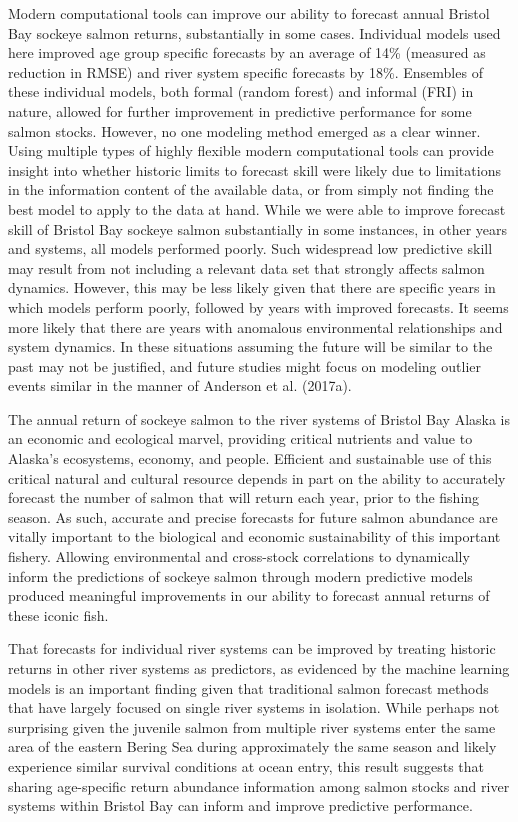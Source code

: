 \documentclass[
]{article}
\begin{document}
Modern computational tools can improve our ability to forecast annual Bristol Bay sockeye salmon returns, substantially in some cases. Individual models used here improved age group specific forecasts by an average of 14\% (measured as reduction in RMSE) and river system specific forecasts by 18\%. Ensembles of these individual models, both formal (random forest) and informal (FRI) in nature, allowed for further improvement in predictive performance for some salmon stocks. However, no one modeling method emerged as a clear winner. Using multiple types of highly flexible modern computational tools can provide insight into whether historic limits to forecast skill were likely due to limitations in the information content of the available data, or from simply not finding the best model to apply to the data at hand. While we were able to improve forecast skill of Bristol Bay sockeye salmon substantially in some instances, in other years and systems, all models performed poorly. Such widespread low predictive skill may result from not including a relevant data set that strongly affects salmon dynamics. However, this may be less likely given that there are specific years in which models perform poorly, followed by years with improved forecasts. It seems more likely that there are years with anomalous environmental relationships and system dynamics. In these situations assuming the future will be similar to the past may not be justified, and future studies might focus on modeling outlier events similar in the manner of Anderson et al. (2017a).

The annual return of sockeye salmon to the river systems of Bristol Bay Alaska is an economic and ecological marvel, providing critical nutrients and value to Alaska's ecosystems, economy, and people. Efficient and sustainable use of this critical natural and cultural resource depends in part on the ability to accurately forecast the number of salmon that will return each year, prior to the fishing season. As such, accurate and precise forecasts for future salmon abundance are vitally important to the biological and economic sustainability of this important fishery. Allowing environmental and cross-stock correlations to dynamically inform the predictions of sockeye salmon through modern predictive models produced meaningful improvements in our ability to forecast annual returns of these iconic fish.

That forecasts for individual river systems can be improved by treating historic returns in other river systems as predictors, as evidenced by the machine learning models is an important finding given that traditional salmon forecast methods that have largely focused on single river systems in isolation. While perhaps not surprising given the juvenile salmon from multiple river systems enter the same area of the eastern Bering Sea during approximately the same season and likely experience similar survival conditions at ocean entry, this result suggests that sharing age-specific return abundance information among salmon stocks and river systems within Bristol Bay can inform and improve predictive performance.
\end{document}

